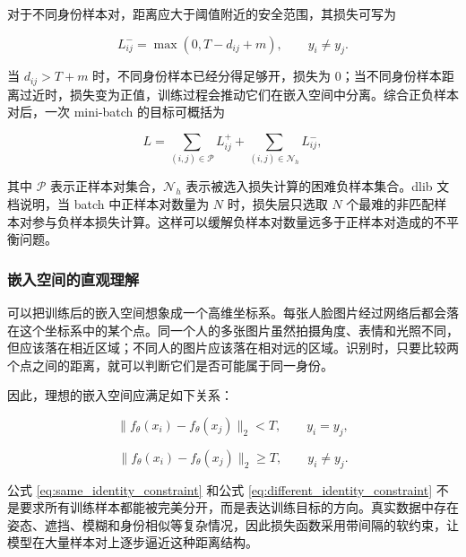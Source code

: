 对于不同身份样本对，距离应大于阈值附近的安全范围，其损失可写为

\begin{equation}
  L_{ij}^{-} = \max(0, T - d_{ij} + m), \qquad y_i \ne y_j.
  \label{eq:negative_loss}
\end{equation}

当 $d_{ij} > T+m$ 时，不同身份样本已经分得足够开，损失为 0；当不同身份样本距离过近时，损失变为正值，训练过程会推动它们在嵌入空间中分离。综合正负样本对后，一次 mini-batch 的目标可概括为

\begin{equation}
  L =
  \sum_{(i,j)\in \mathcal{P}} L_{ij}^{+}
  +
  \sum_{(i,j)\in \mathcal{N}_{h}} L_{ij}^{-},
  \label{eq:metric_loss}
\end{equation}

其中 $\mathcal{P}$ 表示正样本对集合，$\mathcal{N}_{h}$ 表示被选入损失计算的困难负样本集合。dlib 文档说明，当 batch 中正样本对数量为 $N$ 时，损失层只选取 $N$ 个最难的非匹配样本对参与负样本损失计算。这样可以缓解负样本对数量远多于正样本对造成的不平衡问题。

\subsubsection{嵌入空间的直观理解}

可以把训练后的嵌入空间想象成一个高维坐标系。每张人脸图片经过网络后都会落在这个坐标系中的某个点。同一个人的多张图片虽然拍摄角度、表情和光照不同，但应该落在相近区域；不同人的图片应该落在相对远的区域。识别时，只要比较两个点之间的距离，就可以判断它们是否可能属于同一身份。

因此，理想的嵌入空间应满足如下关系：

\begin{equation}
  \lVert f_\theta(x_i) - f_\theta(x_j) \rVert_2 < T,
  \qquad y_i = y_j,
  \label{eq:same_identity_constraint}
\end{equation}

\begin{equation}
  \lVert f_\theta(x_i) - f_\theta(x_j) \rVert_2 \ge T,
  \qquad y_i \ne y_j.
  \label{eq:different_identity_constraint}
\end{equation}

公式 \ref{eq:same_identity_constraint} 和公式 \ref{eq:different_identity_constraint} 不是要求所有训练样本都能被完美分开，而是表达训练目标的方向。真实数据中存在姿态、遮挡、模糊和身份相似等复杂情况，因此损失函数采用带间隔的软约束，让模型在大量样本对上逐步逼近这种距离结构。

